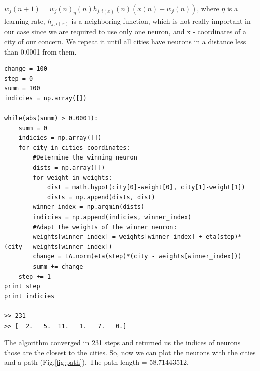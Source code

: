\documentclass[a4paper, 12pt]{article}
\begin{document}
$w_j(n+1) = w_j(n) _ \eta(n) h_{j,i(x)}(n)(x(n) - w_j(n))$,
where $\eta$ is a learning rate, $h_{j,i(x)}$ is a neighboring function, which is not really important in our case since we are required to use only one neuron, and x - coordinates of a city of our concern. We repeat it until all cities have neurons in a distance less than 0.0001 from them.


\lstset{language=Python}
\begin{lstlisting}[frame=single]
change = 100
step = 0
summ = 100
indicies = np.array([])

while(abs(summ) > 0.0001):
    summ = 0
    indicies = np.array([])
    for city in cities_coordinates:
        #Determine the winning neuron 
        dists = np.array([])
        for weight in weights:
            dist = math.hypot(city[0]-weight[0], city[1]-weight[1])
            dists = np.append(dists, dist)
        winner_index = np.argmin(dists)
        indicies = np.append(indicies, winner_index)
        #Adapt the weights of the winner neuron:
        weights[winner_index] = weights[winner_index] + eta(step)*(city - weights[winner_index])
        change = LA.norm(eta(step)*(city - weights[winner_index]))
        summ += change
    step += 1
print step
print indicies

>> 231
>> [  2.   5.  11.   1.   7.   0.]
\end{lstlisting}

The algorithm converged in 231 steps and returned us the indices of neurons those are the closest to the cities. So, now we can plot the neurons with the cities and a path (Fig.\ref{fig:path}). The path length = 58.71443512.
\end{document}
